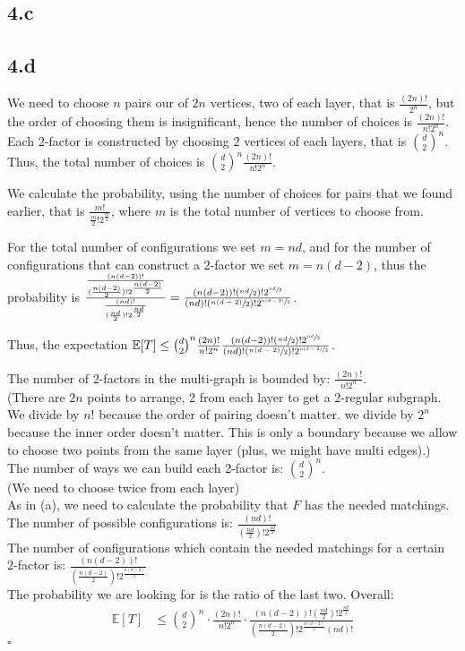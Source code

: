 \documentclass{article}
\begin{document}
\subsection*{4.c}

\subsection*{4.d}
We need to choose $n$ pairs our of $2n$ vertices, two of each layer, that is $\frac{(2n)!}{2^n}$, but the order of choosing them is insignificant, hence the number of choices is $\frac{(2n)!}{n!2^n}$.
Each $2$-factor is constructed by choosing $2$ vertices of each layers, that is $\binom{d}{2}^n$. Thus, the total number of choices is $\binom{d}{2}^n\frac{(2n)!}{n!2^n}$.

We calculate the probability, using the number of choices for pairs that we found earlier, that is $\frac{m!}{\frac{m}{2}!2^{\frac{m}{2}}}$, where $m$ is the total number of vertices to choose from.

For the total number of configurations we set $m=nd$, and for the number of configurations that can construct a $2$-factor we set $m=n(d-2)$, thus the probability is $
\frac{\frac{(n(d-2))!}{(\frac{n(d-2)}{2})!2^{\frac{n(d-2)}{2}}}}{\frac{(nd)!}{(\frac{nd}{2})!2^{\frac{nd}{2}}}}=\frac{(n(d-2))!(\sfrac{nd}{2})!2^{\sfrac{nd}{2}}}{(nd)!(\sfrac{n(d-2)}{2})!2^{\sfrac{n(d-2)}{2}}}$.

Thus, the expectation $\mathbb{E}[T]\leq\binom{d}{2}^n\frac{(2n)!}{n!2^n}\frac{(n(d-2))!(\sfrac{nd}{2})!2^{\sfrac{nd}{2}}}{(nd)!(\sfrac{n(d-2)}{2})!2^{\sfrac{n(d-2)}{2}}}$.

The number of 2-factors in the multi-graph is bounded by: $\frac{(2n)!}{n!2^n}$.\\
(There are $2n$ points to arrange, 2 from each layer to get a 2-regular subgraph. We divide by $n!$ because the order of pairing doesn't matter. we divide by $2^n$ because the inner order doesn't matter. This is only a boundary because we allow to choose two points from the same layer (plus, we might have multi edges).)\\
The number of ways we can build each 2-factor is: $\binom{d}{2}^n$.\\
(We need to choose twice from each layer)\\
As in (a), we need to calculate the probability that $F$ has the needed matchings.\\
The number of possible configurations is: $\frac{(nd)!}{(\tfrac{nd}{2})!2^{\tfrac{nd}{2}}}$\\
The number of configurations which contain the needed matchings for a certain 2-factor is: $\frac{(n(d-2))!}{(\tfrac{n(d-2)}{2})!2^{\tfrac{n(d-2)}{2}}}$\\
The probability we are looking for is the ratio of the last two. Overall:\\
\begin{align*}
\mathbb{E}[T] 
  &\leq \binom{d}{2}^n\cdot \frac{(2n)!}{n!2^n} \cdot \frac{(n(d-2))!(\tfrac{nd}{2})!2^{\tfrac{nd}{2}}}{(\tfrac{n(d-2)}{2})!2^{\tfrac{n(d-2)}{2}}(nd)!}
\end{align*}
\hfill $\square$
\end{document}

